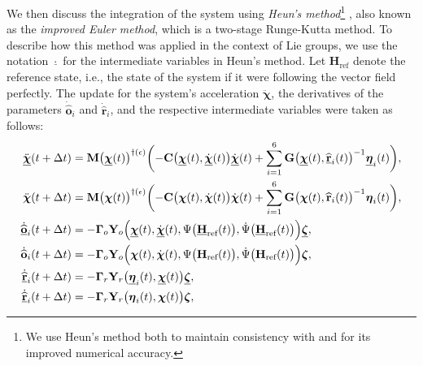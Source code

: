 We then discuss the integration of the system using \emph{Heun's method}\footnote{We use Heun's method both to maintain consistency with \citet{Culbertson2021} and for its improved numerical accuracy.} \citep[p. 330]{fred2007algoritmos}, also known as the \emph{improved Euler method}, which is a two-stage Runge-Kutta method. To describe how this method was applied in the context of Lie groups, we use the notation $\underline{\cdot}$ for the intermediate variables in Heun's method. Let $\mathbf{H}_\text{ref}$ denote the reference state, i.e., the state of the system if it were following the vector field perfectly. The update for the system's acceleration $\ddot{\boldsymbol{\chi}}$, the derivatives of the parameters $\dot{\widehat{\mathbf{o}}}_i$ and $\dot{\widehat{\mathbf{r}}}_i$, and the respective intermediate variables were taken as follows:
\begin{align}
    \begin{split}
        \ddot{\underline{\boldsymbol{\chi}}}(t+\Delta t) &= \mathbf{M}\bigl(\underline{\boldsymbol{\chi}}(t)\bigr)^{\dagger(\epsilon)}\biggl(-\mathbf{C}\bigl(\underline{\boldsymbol{\chi}}(t), \underline{\dot{\boldsymbol{\chi}}}(t)\bigr)\underline{\dot{\boldsymbol{\chi}}}(t)  + \sum_{i=1}^6 \mathbf{G}\bigl(\underline{\boldsymbol{\chi}}(t), \underline{\widehat{\mathbf{r}}}_i(t)\bigr)^{-1}\underline{\boldsymbol{\eta}}_i(t)\biggr),\\
        \ddot{{\boldsymbol{\chi}}}(t+\Delta t) &= \mathbf{M}\bigl({\boldsymbol{\chi}}(t)\bigr)^{\dagger(\epsilon)}\biggl(-\mathbf{C}\bigl({\boldsymbol{\chi}}(t), {\dot{\boldsymbol{\chi}}}(t)\bigr)\dot{\boldsymbol{\chi}}(t)  + \sum_{i=1}^6 \mathbf{G}\bigl({\boldsymbol{\chi}}(t), {\widehat{\mathbf{r}}}_i(t)\bigr)^{-1}{\boldsymbol{\eta}}_i(t)\biggr),\\
        \underline{\dot{\widehat{\mathbf{o}}}}_i(t + \Delta t) &= -\boldsymbol{\Gamma}_o\mathbf{Y}_o\Bigl(\underline{\boldsymbol{\chi}}(t), \underline{\dot{\boldsymbol{\chi}}}(t), \Psi\bigl(\underline{\mathbf{H}}_\text{ref}(t)\bigr), \dot{\Psi}\bigl(\underline{\mathbf{H}}_\text{ref}(t)\bigr)\Bigr)\underline{\boldsymbol{\zeta}},\\
        {\dot{\widehat{\mathbf{o}}}}_i(t + \Delta t) &= -\boldsymbol{\Gamma}_o\mathbf{Y}_o\Bigl({\boldsymbol{\chi}}(t), {\dot{\boldsymbol{\chi}}}(t), \Psi\bigl({\mathbf{H}_\text{ref}}(t)\bigr), \dot{\Psi}\bigl({\mathbf{H}_\text{ref}}(t)\bigr)\Bigr){\boldsymbol{\zeta}},\\
        \underline{\dot{\widehat{\mathbf{r}}}}_i(t + \Delta t) &= -\boldsymbol{\Gamma}_r\mathbf{Y}_r\bigl(\underline{\boldsymbol{\eta}}_i(t), \underline{\boldsymbol{\chi}}(t)\bigr)\underline{\boldsymbol{\zeta}},\\
        \underline{\dot{\widehat{\mathbf{r}}}}_i(t + \Delta t) &= -\boldsymbol{\Gamma}_r\mathbf{Y}_r\bigl({\boldsymbol{\eta}}_i(t), {\boldsymbol{\chi}}(t)\bigr){\boldsymbol{\zeta}},
    \end{split}
\end{align}
